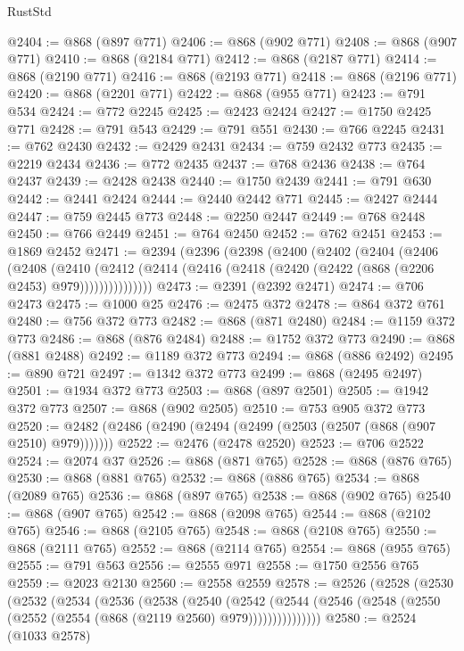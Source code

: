 \begin{lexlean}{RustStd}
\begin{coremodule}
@2404 := @868 (@897 @771)
@2406 := @868 (@902 @771)
@2408 := @868 (@907 @771)
@2410 := @868 (@2184 @771)
@2412 := @868 (@2187 @771)
@2414 := @868 (@2190 @771)
@2416 := @868 (@2193 @771)
@2418 := @868 (@2196 @771)
@2420 := @868 (@2201 @771)
@2422 := @868 (@955 @771)
@2423 := @791 @534
@2424 := @772 @2245
@2425 := @2423 @2424
@2427 := @1750 @2425 @771
@2428 := @791 @543
@2429 := @791 @551
@2430 := @766 @2245
@2431 := @762 @2430
@2432 := @2429 @2431
@2434 := @759 @2432 @773
@2435 := @2219 @2434
@2436 := @772 @2435
@2437 := @768 @2436
@2438 := @764 @2437
@2439 := @2428 @2438
@2440 := @1750 @2439
@2441 := @791 @630
@2442 := @2441 @2424
@2444 := @2440 @2442 @771
@2445 := @2427 @2444
@2447 := @759 @2445 @773
@2448 := @2250 @2447
@2449 := @768 @2448
@2450 := @766 @2449
@2451 := @764 @2450
@2452 := @762 @2451
@2453 := @1869 @2452
@2471 := @2394
    (@2396
      (@2398
        (@2400
          (@2402
            (@2404
              (@2406
                (@2408
                  (@2410
                    (@2412
                      (@2414 (@2416 (@2418 (@2420 (@2422 (@868 (@2206 @2453) @979)))))))))))))))
@2473 := @2391 (@2392 @2471)
@2474 := @706 @2473
@2475 := @1000 @25
@2476 := @2475 @372
@2478 := @864 @372 @761
@2480 := @756 @372 @773
@2482 := @868 (@871 @2480)
@2484 := @1159 @372 @773
@2486 := @868 (@876 @2484)
@2488 := @1752 @372 @773
@2490 := @868 (@881 @2488)
@2492 := @1189 @372 @773
@2494 := @868 (@886 @2492)
@2495 := @890 @721
@2497 := @1342 @372 @773
@2499 := @868 (@2495 @2497)
@2501 := @1934 @372 @773
@2503 := @868 (@897 @2501)
@2505 := @1942 @372 @773
@2507 := @868 (@902 @2505)
@2510 := @753 @905 @372 @773
@2520 := @2482 (@2486 (@2490 (@2494 (@2499 (@2503 (@2507 (@868 (@907 @2510) @979)))))))
@2522 := @2476 (@2478 @2520)
@2523 := @706 @2522
@2524 := @2074 @37
@2526 := @868 (@871 @765)
@2528 := @868 (@876 @765)
@2530 := @868 (@881 @765)
@2532 := @868 (@886 @765)
@2534 := @868 (@2089 @765)
@2536 := @868 (@897 @765)
@2538 := @868 (@902 @765)
@2540 := @868 (@907 @765)
@2542 := @868 (@2098 @765)
@2544 := @868 (@2102 @765)
@2546 := @868 (@2105 @765)
@2548 := @868 (@2108 @765)
@2550 := @868 (@2111 @765)
@2552 := @868 (@2114 @765)
@2554 := @868 (@955 @765)
@2555 := @791 @563
@2556 := @2555 @971
@2558 := @1750 @2556 @765
@2559 := @2023 @2130
@2560 := @2558 @2559
@2578 := @2526
    (@2528
      (@2530
        (@2532
          (@2534
            (@2536
              (@2538
                (@2540
                  (@2542
                    (@2544
                      (@2546 (@2548 (@2550 (@2552 (@2554 (@868 (@2119 @2560) @979)))))))))))))))
@2580 := @2524 (@1033 @2578)

\end{coremodule}
\end{lexlean}
